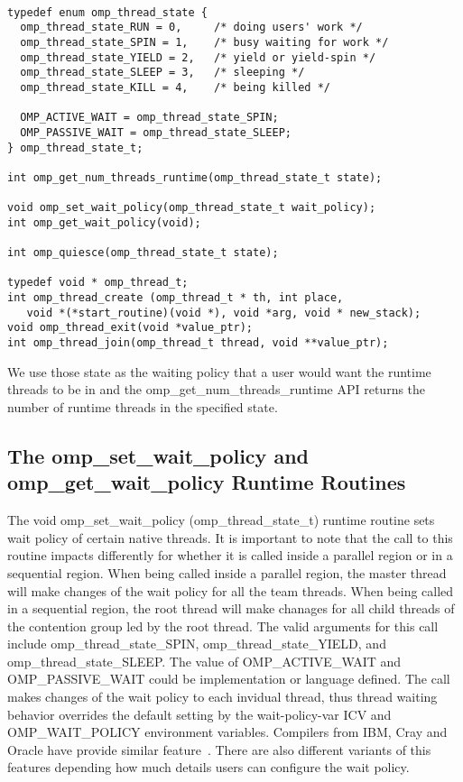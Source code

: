 \lstset{basicstyle=\sffamily\small,language=c, numbersep=1pt}
\begin{lstlisting}[frame=single]  % Start your code-block

typedef enum omp_thread_state {
  omp_thread_state_RUN = 0,     /* doing users' work */
  omp_thread_state_SPIN = 1,    /* busy waiting for work */
  omp_thread_state_YIELD = 2,   /* yield or yield-spin */
  omp_thread_state_SLEEP = 3,   /* sleeping */
  omp_thread_state_KILL = 4,    /* being killed */

  OMP_ACTIVE_WAIT = omp_thread_state_SPIN;
  OMP_PASSIVE_WAIT = omp_thread_state_SLEEP;
} omp_thread_state_t; 

int omp_get_num_threads_runtime(omp_thread_state_t state);

void omp_set_wait_policy(omp_thread_state_t wait_policy);
int omp_get_wait_policy(void);

int omp_quiesce(omp_thread_state_t state);

typedef void * omp_thread_t;
int omp_thread_create (omp_thread_t * th, int place,  
   void *(*start_routine)(void *), void *arg, void * new_stack);
void omp_thread_exit(void *value_ptr);
int omp_thread_join(omp_thread_t thread, void **value_ptr);

\end{lstlisting}

We use those state as the waiting policy that a user would want the runtime threads to be in and the {\sf omp\_get\_num\_threads\_runtime} API returns the number of runtime threads in the specified state.

\subsection{The {\sf omp\_set\_wait\_policy} and {\sf omp\_get\_wait\_policy} Runtime Routines}
The {\sf void omp\_set\_wait\_policy (omp\_thread\_state\_t)} runtime routine sets wait policy of certain 
native threads. It is important to note that the call to this routine impacts differently for 
whether it is called inside a {\sf parallel} region or in a sequential region. 
When being called inside a parallel region, the master thread will make changes of the wait policy for all the team 
threads. When being called in a sequential region, the root thread will make chanages for all child threads of 
the contention group led by the root thread. The valid arguments for this call 
include {\sf omp\_thread\_state\_SPIN}, {\sf omp\_thread\_state\_YIELD}, 
and {\sf omp\_thread\_state\_SLEEP}. The value of  {\sf OMP\_ACTIVE\_WAIT} and 
{\sf OMP\_PASSIVE\_WAIT} could be implementation or language defined. The call makes changes of the wait
policy to each invidual thread, thus thread waiting behavior overrides the default 
setting by the wait-policy-var ICV and OMP\_WAIT\_POLICY environment variables. 
Compilers from IBM, Cray and Oracle have provide similar feature~\cite{ibmwait,craywait,oraclewait}.
There are also different variants of this features depending how much details users can configure
the wait policy.

